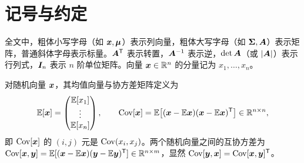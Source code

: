 \section{记号与约定}

全文中，粗体小写字母（如 $\vx,\vmu$）表示列向量，粗体大写字母（如 $\mSigma,\mA$）表示矩阵，普通斜体字母表示标量。$\mA^\T$ 表示转置，$\mA^{-1}$ 表示逆，$\det\mA$（或 $|\mA|$）表示行列式，$\mI_n$ 表示 $n$ 阶单位矩阵。向量 $\vx\in\R^n$ 的分量记为 $x_1,\dots,x_n$。

对随机向量 $\vx$，其均值向量与协方差矩阵定义为
\[
\E[\vx]=\begin{pmatrix}\E[x_1]\\ \vdots\\ \E[x_n]\end{pmatrix},\qquad
\Cov[\vx]=\E\big[(\vx-\E\vx)(\vx-\E\vx)^\T\big]\in\R^{n\times n},
\]
即 $\Cov[\vx]$ 的 $(i,j)$ 元是 $\Cov(x_i,x_j)$。两个随机向量之间的互协方差为 $\Cov[\vx,\vy]=\E[(\vx-\E\vx)(\vy-\E\vy)^\T]\in\R^{n\times m}$，显然 $\Cov[\vy,\vx]=\Cov[\vx,\vy]^\T$。

